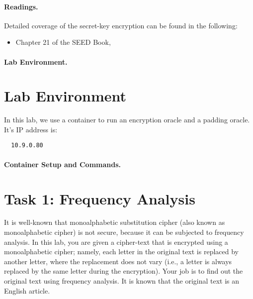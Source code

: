 \paragraph{Readings.}
Detailed coverage of the secret-key encryption can be found in the following:

\begin{itemize}
\item Chapter 21 of the SEED Book, \seedbook
\end{itemize}


\paragraph{Lab Environment.} \seedenvironmentB


\section{Lab Environment}

In this lab, we use a container to run an encryption oracle
and a padding oracle.
It's IP address is:
\begin{lstlisting}
  10.9.0.80
\end{lstlisting}


\paragraph{Container Setup and Commands.}




\section{Task 1: Frequency Analysis}

It is well-known that monoalphabetic substitution cipher (also known as monoalphabetic cipher)
is not secure, because it can be subjected to frequency analysis. In this lab, you are given
a cipher-text that is encrypted using a monoalphabetic cipher; namely,
each letter in the original text is replaced by another letter,
where the replacement does not vary (i.e., a letter is always replaced by the same letter
during the encryption). Your job is to find out the original text using
frequency analysis. It is known that the original text is an English article.


